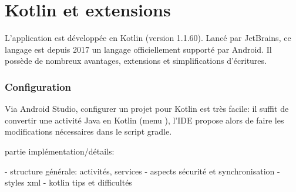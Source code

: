 
\section{Kotlin et extensions}

L'application est développée en Kotlin (version 1.1.60). Lancé par JetBrains, ce langage est depuis 2017 un langage officiellement supporté par Android. Il possède de nombreux avantages, extensions et simplifications d'écritures.

\subsubsection*{Configuration}
Via Android Studio, configurer un projet pour Kotlin est très facile: il suffit de convertir une activité Java en Kotlin (menu ), l'IDE propose alors de faire les modifications nécessaires dans le script gradle.




partie implémentation/détails:

- structure générale: activités, services
- aspects sécurité et synchronisation
- styles xml 
- kotlin tips et difficultés